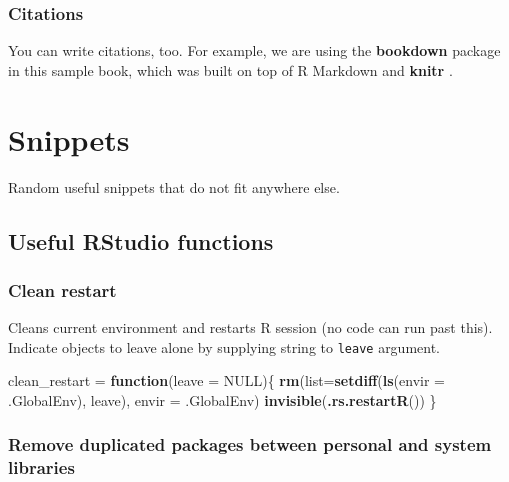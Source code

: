 \documentclass[
]{book}
\newenvironment{Shaded}{\begin{snugshade}}{\end{snugshade}}
\newcommand{\ControlFlowTok}[1]{\textcolor[rgb]{0.13,0.29,0.53}{\textbf{#1}}}
\newcommand{\DataTypeTok}[1]{\textcolor[rgb]{0.13,0.29,0.53}{#1}}
\newcommand{\KeywordTok}[1]{\textcolor[rgb]{0.13,0.29,0.53}{\textbf{#1}}}
\newcommand{\NormalTok}[1]{#1}
\newcommand{\OtherTok}[1]{\textcolor[rgb]{0.56,0.35,0.01}{#1}}
\newcommand{\StringTok}[1]{\textcolor[rgb]{0.31,0.60,0.02}{#1}}
\begin{document}
\hypertarget{citations}{%
\subsection{Citations}\label{citations}}

You can write citations, too. For example, we are using the \textbf{bookdown} package \citep{R-bookdown} in this sample book, which was built on top of R Markdown and \textbf{knitr} \citep{xie2015}.

\hypertarget{snippets}{%
\chapter{Snippets}\label{snippets}}

Random useful snippets that do not fit anywhere else.

\hypertarget{useful-rstudio-functions}{%
\section{Useful RStudio functions}\label{useful-rstudio-functions}}

\hypertarget{clean-restart}{%
\subsection{Clean restart}\label{clean-restart}}

Cleans current environment and restarts R session (no code can run past this). Indicate objects to leave alone by supplying string to \texttt{leave} argument.

\begin{Shaded}
\begin{Highlighting}[]
\NormalTok{clean_restart =}\StringTok{ }\ControlFlowTok{function}\NormalTok{(}\DataTypeTok{leave =} \OtherTok{NULL}\NormalTok{)\{}
  \KeywordTok{rm}\NormalTok{(}\DataTypeTok{list=}\KeywordTok{setdiff}\NormalTok{(}\KeywordTok{ls}\NormalTok{(}\DataTypeTok{envir =}\NormalTok{ .GlobalEnv), leave), }\DataTypeTok{envir =}\NormalTok{ .GlobalEnv)}
  \KeywordTok{invisible}\NormalTok{(}\KeywordTok{.rs.restartR}\NormalTok{())}
\NormalTok{\}}
\end{Highlighting}
\end{Shaded}

\hypertarget{remove-duplicated-packages-between-personal-and-system-libraries}{%
\subsection{Remove duplicated packages between personal and system libraries}\label{remove-duplicated-packages-between-personal-and-system-libraries}}
\end{document}

